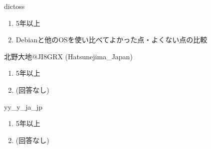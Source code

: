 \begin{prework}{ dictoss }
  \begin{enumerate}
  \item 5年以上
  \item Debianと他のOSを使い比べてよかった点・よくない点の比較
  \end{enumerate}
\end{prework}

\begin{prework}{ 北野大地@JI8GRX (Hatsunejima\_Japan) }
  \begin{enumerate}
  \item 5年以上
  \item (回答なし)
  \end{enumerate}
\end{prework}

\begin{prework}{ yy\_y\_ja\_jp }
  \begin{enumerate}
  \item 5年以上
  \item (回答なし)
  \end{enumerate}
\end{prework}
